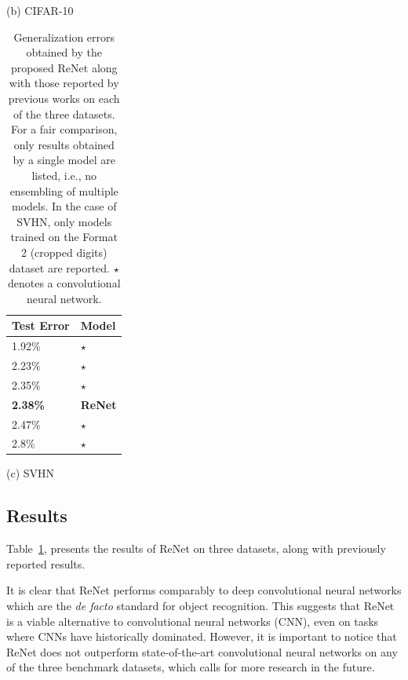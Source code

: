 \begin{table}[ht]
\begin{minipage}{0.45\textwidth}
        \vspace{2mm}
        (b) CIFAR-10
    \end{minipage}

    \vspace{4mm}
    \begin{minipage}{0.45\textwidth}
        \centering
        \begin{tabular}{l |  l}
            Test Error & Model  \\
            \hline
1.92\% & \citep{DBLP:journals/corr/LeeXGZT14}$\star$ \\
2.23\% & \citep{DBLP:conf/icml/WanZZLF13}$\star$ \\
2.35\% & \citep{Lin2014}$\star$ \\
\bf{2.38\%} & \bf{ReNet} \\
2.47\% & \citep{Goodfellow2013}$\star$ \\
2.8\% & \citep{DBLP:journals/corr/abs-1301-3557}$\star$ \\
        \end{tabular}

        \vspace{2mm}
        (c) SVHN
    \end{minipage}
    \hfill
    \begin{minipage}{0.51\textwidth}
        \caption{Generalization errors obtained by the proposed ReNet along
            with those reported by previous works on each of the three
            datasets. For a fair comparison, only results obtained by a single
            model are listed, i.e., no ensembling of multiple models. In the
            case of SVHN, only models trained on the Format 2 (cropped digits)
            dataset are reported. $\star$ denotes a convolutional neural
            network.}
        \label{tbl:result}
    \end{minipage}
\end{table}

\subsection{Results}\label{sec:renet_results}
Table~\ref{tbl:result}, presents the results of ReNet on three datasets, along
with previously reported results.

It is clear that ReNet performs comparably to deep convolutional neural
networks which are the {\it de facto} standard for object recognition. This
suggests that ReNet is a viable alternative to convolutional neural networks
(CNN), even on tasks where CNNs have historically dominated. However, it is
important to notice that ReNet does not outperform state-of-the-art
convolutional neural networks on any of the three benchmark datasets, which
calls for more research in the future.

